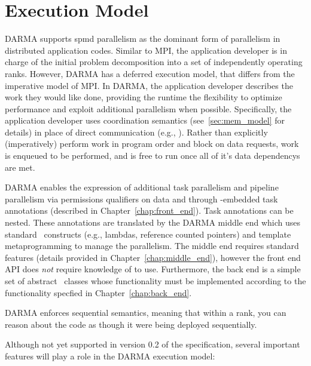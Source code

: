 \section{Execution Model}
\label{sec:exec_model}
DARMA supports \gls{spmd} parallelism as the dominant form of parallelism in
distributed application codes. Similar to \gls{MPI}, the application developer
is in charge of the initial problem decomposition into a set of
independently operating \glspl{rank}. 
However, DARMA has a \gls{deferred} \gls{execution model}, that differs from the
\gls{imperative} model of \gls{MPI}.
In DARMA, the application developer describes the
work they would like done, providing the runtime the flexibility to optimize performance and
exploit additional parallelism when possible.    
Specifically, the application developer uses \gls{coordination semantics}
(see~\ref{sec:mem_model} for details) in place of direct communication (e.g.,
    ).  Rather than explicitly (imperatively)
perform work in program order and block on data requests, work is enqueued to
be performed, and is free to run once all of it's data \glspl{dependency} are met.


DARMA enables the expression of additional \gls{task parallelism} and
\gls{pipeline parallelism} via permissions qualifiers on data 
and through \CC-embedded task annotations (described in
    Chapter~\ref{chap:front_end}). Task annotations can be nested.
These annotations are translated by
the DARMA \gls{middle end} which uses standard \CC\ constructs (e.g., lambdas,
  reference counted pointers) and \gls{template
metaprogramming} to manage the parallelism.  The \gls{middle end} requires
 standard features (details provided in Chapter~\ref{chap:middle_end}), 
  however the \gls{front end} \gls{API} does \emph{not}
require knowledge of  to use. Furthermore, the \gls{back end} is a
simple set of abstract \CC\ classes whose functionality must be implemented
according to the functionality specfied in Chapter~\ref{chap:back_end}.

DARMA enforces \gls{sequential semantics}, meaning that within a \gls{rank}, you can reason about the code as
though it were being deployed sequentially.   


Although not yet supported in version 0.2 of the specification, several
important features will play a role in the DARMA execution model:

